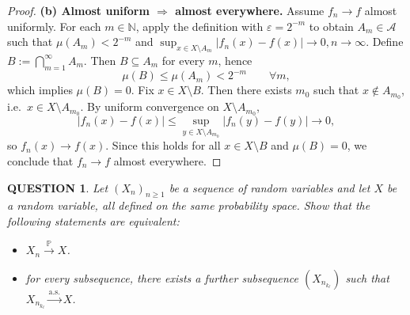 \documentclass[12pt]{article}
\renewcommand{\(}{\left(}%
\renewcommand{\)}{\right)}%
\renewcommand{\[}{\left[}%
\renewcommand{\]}{\right]}%
\newtheorem{question}{QUESTION}[section]}
\newtheorem{proof}{Proof.}}
\begin{document}
\begin{proof}
\medskip\noindent
\textbf{(b) Almost uniform $\Rightarrow$ almost everywhere.}
Assume $f_n\to f$ almost uniformly. For each $m\in\mathbb N$, apply the definition with
$\varepsilon=2^{-m}$ to obtain $A_m\in\mathcal A$ such that $\mu(A_m)<2^{-m}$
and $\sup_{x\in X\setminus A_m}|f_n(x)-f(x)|\to 0,n\to\infty$.
Define $B:=\bigcap_{m=1}^\infty A_m.$
Then $B\subseteq A_m$ for every $m$, hence
\begin{equation*}
\mu(B)\le \mu(A_m)<2^{-m}\qquad \forall m,
\end{equation*}
which implies $\mu(B)=0$.
Fix $x\in X\setminus B$. Then there exists $m_0$ such that $x\notin A_{m_0}$, i.e.\ $x\in X\setminus A_{m_0}$.
By uniform convergence on $X\setminus A_{m_0}$,
\begin{equation*}
|f_n(x)-f(x)|
\le
\sup_{y\in X\setminus A_{m_0}}|f_n(y)-f(y)|
\to 0,
\end{equation*}
so $f_n(x)\to f(x)$. Since this holds for all $x\in X\setminus B$ and $\mu(B)=0$, we conclude that
$f_n\to f$ almost everywhere.
\end{proof}

\begin{question}
Let $(X_n)_{n\ge1}$ be a sequence of random variables and let $X$ be a random variable,
all defined on the same probability space.
Show that the following statements are equivalent:
\begin{itemize}
	\item $X_n \xrightarrow{\mathbb P} X$.
	\item for every subsequence, there exists a further subsequence $(X_{n_{k_\ell}})$ such that $X_{n_{k_\ell}} \xrightarrow{\mathrm{a.s.}} X$.
\end{itemize}
\end{question}
\end{document}
